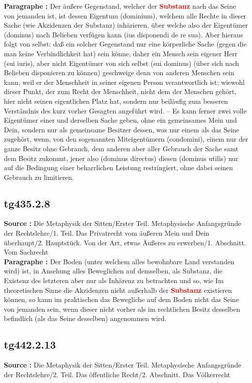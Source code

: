 \documentclass[a4paper,12pt,twoside]{book}
\newcommand{\match}[1]{\textcolor{red}{\textbf{#1}}}
\begin{document}
	\textbf{Paragraphe : }Der äußere Gegenstand, welcher der \match{Substanz} nach das Seine von jemanden ist, ist dessen Eigentum (dominium), welchem alle Rechte in dieser Sache (wie Akzidenzen der Substanz) inhärieren, über welche also der Eigentümer (dominus) nach Belieben verfügen kann (ius disponendi de re sua). Aber hieraus folgt von selbst:  daß ein solcher Gegenstand nur eine körperliche Sache (gegen die man keine Verbindlichkeit hat) sein könne, daher ein Mensch sein eigener Herr (sui iuris), aber nicht Eigentümer von sich selbst (sui dominus) (über sich nach Belieben disponieren zu können) geschweige denn von anderen Menschen sein kann, weil er der Menschheit in seiner eigenen Person verantwortlich ist; wiewohl dieser Punkt, der zum Recht der Menschheit, nicht dem der Menschen gehört, hier nicht seinen eigentlichen Platz hat, sondern nur beiläufig zum besseren Verständnis des kurz vorher Gesagten angeführt wird. – Es kann ferner zwei volle Eigentümer einer und derselben Sache geben, ohne ein gemeinsames Mein und Dein, sondern nur als gemeinsame Besitzer dessen, was nur einem als das Seine zugehört, wenn, von den sogenannten Miteigentümern (condomini), einem nur der ganze Besitz ohne Gebrauch, dem anderen aber aller Gebrauch der Sache samt dem Besitz zukommt, jener also (dominus directus) diesen (dominus utilis) nur auf die Bedingung einer beharrlichen Leistung restringiert, ohne dabei seinen Gebrauch zu limitieren. 
	
	\subsection*{tg435.2.8} 
	\textbf{Source : }Die Metaphysik der Sitten/Erster Teil. Metaphysische Anfangsgründe der Rechtslehre/1. Teil. Das Privatrecht vom äußeren Mein und Dein überhaupt/2. Hauptstück. Von der Art, etwas Äußeres zu erwerben/1. Abschnitt. Vom Sachrecht\\  
	
	\textbf{Paragraphe : }Der Boden (unter welchem alles bewohnbare Land verstanden wird) ist, in Ansehung alles Beweglichen auf demselben, als Substanz, die Existenz des letzteren aber nur als Inhärenz zu betrachten und so, wie Im theoretischen Sinne die Akzidenzen nicht außerhalb der \match{Substanz} existieren können, so kann im praktischen das Bewegliche auf dem Boden nicht das Seine von jemanden sein, wenn dieser nicht vorher als im rechtlichen Besitz desselben befindlich (als das Seine desselben) angenommen wird. 
	
	\subsection*{tg442.2.13} 
	\textbf{Source : }Die Metaphysik der Sitten/Erster Teil. Metaphysische Anfangsgründe der Rechtslehre/2. Teil. Das öffentliche Recht/2. Abschnitt. Das Völkerrecht\\  
	
\end{document}
